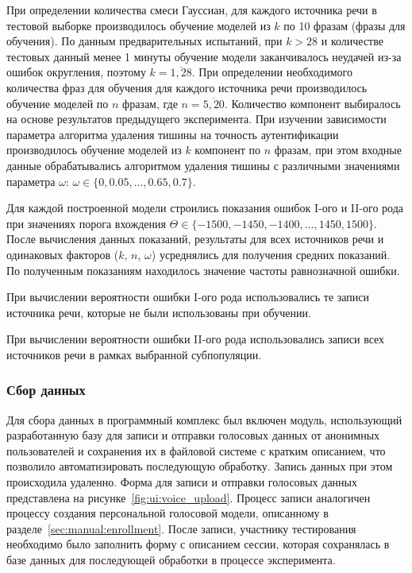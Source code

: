 При определении количества смеси Гауссиан, для каждого источника речи в тестовой выборке производилось обучение моделей из $k$ по 10 фразам (фразы для обучения). По данным предварительных испытаний, при $k>28$ и количестве тестовых данный менее 1 минуты обучение модели заканчивалось неудачей из-за ошибок округления, поэтому $k=\overline{1,28}$.
При определении необходимого количества фраз для обучения для каждого источника речи производилось обучение моделей по $n$ фразам, где $n=\overline{5, 20}$. Количество компонент выбиралось на основе результатов предыдущего эксперимента.
При изучении зависимости параметра алгоритма удаления тишины на точность аутентификации производилось обучение моделей из $k$ компонент по $n$ фразам, при этом входные данные обрабатывались алгоритмом удаления тишины с различными значениями параметра $\omega$: $\omega \in \{0, 0.05, \dots, 0.65, 0.7\}$.

Для каждой построенной модели строились показания ошибок I-ого и II-ого рода при значениях порога вхождения $\Theta \in \{-1500, -1450, -1400, \dots, 1450, 1500\}$. После вычисления данных показаний, результаты для всех источников речи и одинаковых факторов ($k$, $n$, $\omega$) усреднялись для получения средних показаний. По полученным показаниям находилось значение частоты равнозначной ошибки.

При вычислении вероятности ошибки I-ого рода использовались те записи источника речи, которые не были использованы при обучении.

При вычислении вероятности ошибки II-ого рода использовались записи всех источников речи в рамках выбранной субпопуляции.

\subsubsection*{Сбор данных}

Для сбора данных в программный комплекс был включен модуль, использующий
разработанную базу для записи и отправки голосовых данных от анонимных
пользователей и сохранения их в файловой системе с кратким описанием, что
позволило автоматизировать последующую обработку. Запись данных при этом
происходила удаленно. Форма для записи и отправки голосовых данных представлена
на рисунке~\ref{fig:ui:voice_upload}. Процесс записи аналогичен процессу
создания персональной голосовой модели, описанному в
разделе~\ref{sec:manual:enrollment}. После записи, участнику тестирования
необходимо было заполнить форму с описанием сессии, которая сохранялась в базе
данных для последующей обработки в процессе эксперимента.

